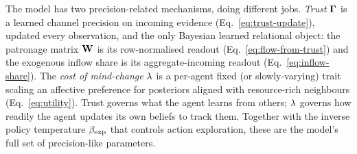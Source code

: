 \begin{remark}
The model has two precision-related mechanisms, doing different jobs.
\emph{Trust} $\boldsymbol{\Gamma}$ is a learned channel precision on incoming
evidence (Eq.~\ref{eq:trust-update}), updated every observation, and
the only Bayesian learned relational object: the patronage matrix
$\mathbf{W}$ is its row-normalised readout
(Eq.~\ref{eq:flow-from-trust}) and the exogenous inflow share is its
aggregate-incoming readout (Eq.~\ref{eq:inflow-share}). The \emph{cost
of mind-change} $\lambda$ is a per-agent fixed (or slowly-varying) trait
scaling an affective preference for posteriors aligned with
resource-rich neighbours (Eq.~\ref{eq:utility}). Trust governs what the
agent learns from others; $\lambda$ governs how readily the agent
updates its own beliefs to track them. Together with the inverse
policy temperature $\beta_{\mathrm{exp}}$ that controls action exploration, these
are the model's full set of precision-like parameters.
\end{remark}
